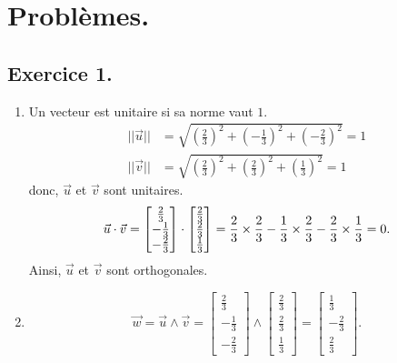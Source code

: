 \documentclass{article}
\begin{document}
\section*{Problèmes.}
\subsection*{Exercice 1.}
\begin{enumerate}
	\item	Un vecteur est unitaire si sa norme vaut $1.$	\begin{align*}
			||\vec{u}||&=\sqrt{(\frac{2}{3})^2+(-\frac{1}{3})^2+(-\frac{2}{3})^2}=1\\
			||\vec{v}||&=\sqrt{(\frac{2}{3})^2+(\frac{2}{3})^2+(\frac{1}{3})^2}=1
		\end{align*}
		donc, $\vec{u}$ et $\vec{v}$ sont unitaires.
		$$\vec{u}\cdot\vec{v}=\begin{bmatrix}\frac{2}{3}\\ -\frac{1}{3}\\ -\frac{2}{3} \end{bmatrix}\cdot\begin{bmatrix}\frac{2}{3}\\ \frac{2}{3} \\ \frac{1}{3}\end{bmatrix}=\frac{2}{3}\times\frac{2}{3}-\frac{1}{3}\times\frac{2}{3}-\frac{2}{3}\times\frac{1}{3}\\=0.$$
		Ainsi, $\vec{u}$ et $\vec{v}$ sont orthogonales.
	\item  \[
			\vec{w}=\vec{u}\wedge\vec{v}=\begin{bmatrix}\frac{2}{3}\\ -\frac{1}{3}\\ -\frac{2}{3} \end{bmatrix}\wedge\begin{bmatrix}\frac{2}{3}\\ \frac{2}{3} \\ \frac{1}{3}\end{bmatrix}=\begin{bmatrix}\frac{1}{3} \\ -\frac{2}{3} \\ \frac{2}{3}\end{bmatrix}
	.\] 
\end{enumerate}
\end{document}
